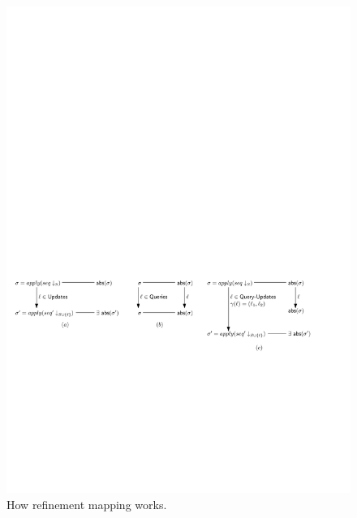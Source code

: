 \begin{figure}[t]
  \centering
  \includegraphics[width=0.8 \textwidth]{figures/RefinementMapping.pdf}
\vspace{-10pt}
  \caption{How refinement mapping works.}
  \label{fig:how refinement mapping works}
\end{figure}


















































